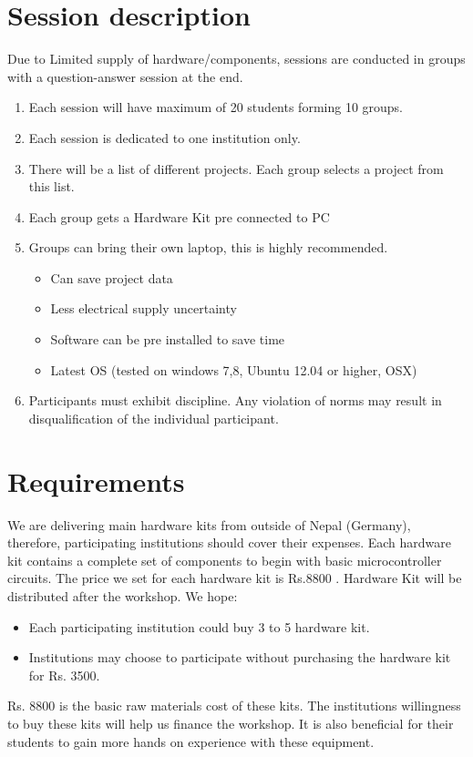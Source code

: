 \documentclass[12pt]{article} %
\begin{document}
\section{Session description} %
Due to Limited supply of hardware/components, sessions are conducted in groups with a question-answer session at the end.
\begin{enumerate}
\item Each session will have maximum of 20 students forming 10 groups.
\item Each session is dedicated to one institution only.
\item There will be a list of different projects. Each group selects a project from this list.  
\item Each group gets a Hardware Kit pre connected to PC 
\item Groups can bring their own laptop, this is highly recommended. 
	\begin{itemize}
	\item Can save project data
	\item Less electrical supply uncertainty
	\item Software can be pre installed to save time
	\item Latest OS (tested on windows 7,8, Ubuntu 12.04 or higher, OSX)
	\end{itemize}
\item Participants must exhibit discipline. Any violation of norms may result in disqualification of the individual participant.
\end{enumerate}

\section{Requirements} %
We are delivering main hardware kits from outside of Nepal (Germany), therefore, participating institutions should cover their expenses. Each hardware kit contains a complete set of components to begin with basic microcontroller circuits. The price we set for each hardware kit is Rs.8800 . Hardware Kit will be distributed after the workshop. We hope:
\begin{itemize}

\item Each participating institution could buy 3 to 5 hardware kit.
\item Institutions may choose to participate without purchasing the hardware kit for Rs. 3500.
\end{itemize}
Rs. 8800 is the basic raw materials cost of these kits. The institutions willingness to buy these kits will help us finance the workshop. It is also beneficial for their students to gain more hands on experience with these equipment.
\end{document}
